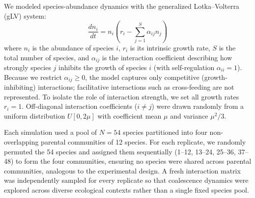 We modeled species-abundance dynamics with the generalized Lotka--Volterra (gLV) system:
\begin{equation}
\frac{dn_i}{dt} = n_i \left( r_i - \sum_{j=1}^{S} \alpha_{ij} n_j \right)
\label{eq:glv}
\end{equation}
where $n_i$ is the abundance of species $i$, $r_i$ is its intrinsic growth rate, $S$ is the total number of species, and $\alpha_{ij}$ is the interaction coefficient describing how strongly species $j$ inhibits the growth of species $i$ (with self-regulation $\alpha_{ii} = 1$).  Because we restrict $\alpha_{ij} \geq 0$, the model captures only competitive (growth-inhibiting) interactions; facilitative interactions such as cross-feeding are not represented. To isolate the role of interaction strength, we set all growth rates $r_i = 1$. Off-diagonal interaction coefficients ($i \neq j$) were drawn randomly from a uniform distribution $U[0, 2\mu]$ with coefficient mean $\mu$ and variance $\mu^2/3$.  

Each simulation used a pool of $N = 54$ species partitioned into four non-overlapping parental communities of 12 species. For each replicate, we randomly permuted the 54 species and assigned them sequentially (1--12, 13--24, 25--36, 37--48) to form the four communities, ensuring no species were shared across parental communities, analogous to the experimental design. A fresh interaction matrix was independently sampled for every replicate so that coalescence dynamics were explored across diverse ecological contexts rather than a single fixed species pool.


